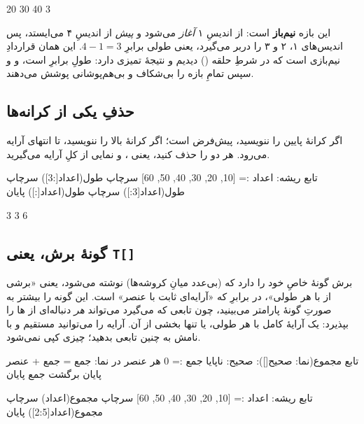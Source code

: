 \begin{progout}
20 30 40
3
\end{progout}

این بازه \textbf{نیم‌باز} است:  از اندیسِ ۱ \emph{آغاز} می‌شود و
\emph{پیش} از اندیسِ ۴ می‌ایستد، پس اندیس‌های ۱، ۲ و ۳ را دربر می‌گیرد، یعنی
طولی برابرِ $4-1=3$. این همان قراردادِ نیم‌بازی است که در شرطِ حلقه
() دیدیم و نتیجهٔ تمیزی دارد: طولِ  برابرِ
 است، و  و سپس  تمامِ بازه را
بی‌شکاف و بی‌هم‌پوشانی پوشش می‌دهند.

\subsection{حذفِ یکی از کرانه‌ها}

اگر کرانهٔ پایین را ننویسید، پیش‌فرض  است؛ اگر کرانهٔ بالا را ننویسید، تا
انتهای آرایه می‌رود. هر دو را حذف کنید، یعنی ، و نمایی از کلِ آرایه
می‌گیرید.

\begin{salamfa}
تابع ریشه:
    اعداد := [10, 20, 30, 40, 50, 60]
    سرچاپ طول(اعداد[:3])
    سرچاپ طول(اعداد[3:])
    سرچاپ طول(اعداد[:])
پایان
\end{salamfa}

\begin{progout}
3
3
6
\end{progout}

\subsection{گونهٔ برش، یعنی \texttt{T[]}}

برش گونهٔ خاصِ خود را دارد که  (بی‌عدد میانِ کروشه‌ها) نوشته می‌شود، یعنی
«برشی از  با هر طولی»، در برابرِ  که «آرایه‌ای ثابت با
 عنصر» است. این گونه را بیشتر به صورتِ گونهٔ پارامتر می‌بینید، چون تابعی
که  می‌گیرد می‌تواند \emph{هر} دنباله‌ای از ها را بپذیرد:
یک آرایهٔ کامل با هر طولی، یا تنها بخشی از آن. آرایه را می‌توانید مستقیم و با
نامش به چنین تابعی بدهید؛ چیزی کپی نمی‌شود.

\begin{salamfa}
تابع مجموع(نما: صحیح[]): صحیح:
    ناپایا جمع := 0
    هر عنصر در نما:
        جمع = جمع + عنصر
    پایان
    برگشت جمع
پایان

تابع ریشه:
    اعداد := [10, 20, 30, 40, 50, 60]
    سرچاپ مجموع(اعداد)
    سرچاپ مجموع(اعداد[2:5])
پایان
\end{salamfa}

